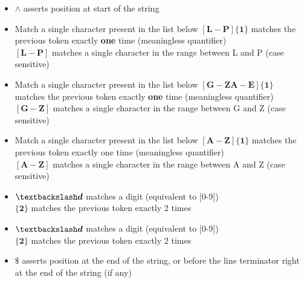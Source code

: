 \documentclass[
	12pt, %
]{fphw}
\begin{document}
\begin{itemize}
\item  $\wedge$ asserts position at start of the string
\item Match a single character present in the list below $\boldsymbol{[L-P]\{1\}}$ matches the previous token exactly \textbf{one} time (meaningless quantifier)\\
  $\boldsymbol{[L-P]}$ matches a single character in the range between L and P (case sensitive)
\item Match a single character present in the list below $\boldsymbol{[G-ZA-E]\{1\}}$ matches the previous token exactly \textbf{one} time (meaningless quantifier)\\
  $\boldsymbol{[G-Z]}$ matches a single character in the range between G and Z (case sensitive)\\
\item Match a single character present in the list below $\boldsymbol{[A-Z]\{1\}}$ matches the previous token exactly one time (meaningless quantifier)\\
  $\boldsymbol{[A-Z]}$ matches a single character in the range between A and Z (case sensitive)
\item $\boldsymbol{\textbackslash d}$ matches a digit (equivalent to [0-9])\\
  $\boldsymbol{\{2\}}$ matches the previous token exactly 2 times
\item $\boldsymbol{\textbackslash d}$ matches a digit (equivalent to [0-9])\\
  $\boldsymbol{\{2\}}$ matches the previous token exactly 2 times
  \item $\boldsymbol{\$}$ asserts position at the end of the string, or before the line terminator right at the end of the string (if any)
\end{itemize}
\end{document}
